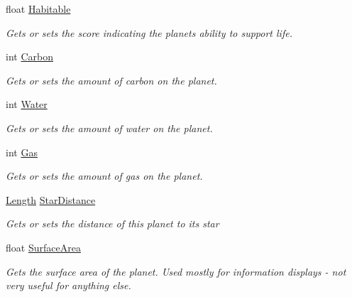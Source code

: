 \begin{DoxyCompactItemize}
float \hyperlink{class_midnight_blue_1_1_planet_metadata_a918efa02de6f3aae58d4cc3804d149eb}{Habitable}
\begin{DoxyCompactList}\small\item\em Gets or sets the score indicating the planets ability to support life. \end{DoxyCompactList}\item 
int \hyperlink{class_midnight_blue_1_1_planet_metadata_abb8cb39cd167a260d08f505ad038eb90}{Carbon}
\begin{DoxyCompactList}\small\item\em Gets or sets the amount of carbon on the planet. \end{DoxyCompactList}\item 
int \hyperlink{class_midnight_blue_1_1_planet_metadata_a0b1319aa47d656c56cbcda678a938235}{Water}
\begin{DoxyCompactList}\small\item\em Gets or sets the amount of water on the planet. \end{DoxyCompactList}\item 
int \hyperlink{class_midnight_blue_1_1_planet_metadata_ada2ca7bb1b67a18098a2fadd7f958ec9}{Gas}
\begin{DoxyCompactList}\small\item\em Gets or sets the amount of gas on the planet. \end{DoxyCompactList}\item 
\hyperlink{class_midnight_blue_1_1_length}{Length} \hyperlink{class_midnight_blue_1_1_planet_metadata_a64e2d5e667ebf1d04a031ded2f68a718}{Star\+Distance}
\begin{DoxyCompactList}\small\item\em Gets or sets the distance of this planet to its star \end{DoxyCompactList}\item 
float \hyperlink{class_midnight_blue_1_1_planet_metadata_a3fde09dbb0d471d2d50020f73089b475}{Surface\+Area}
\begin{DoxyCompactList}\small\item\em Gets the surface area of the planet. Used mostly for information displays -\/ not very useful for anything else. \end{DoxyCompactList}\end{DoxyCompactItemize}



